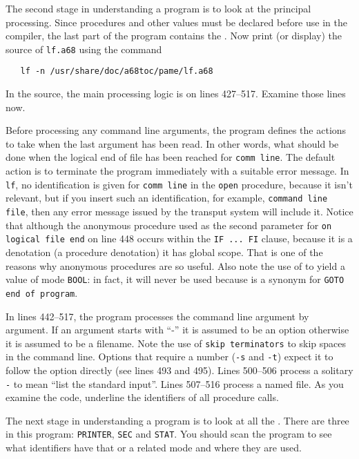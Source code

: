 The second stage in understanding a program is to look at the
principal processing. Since procedures and other values must be
declared before use in the  compiler,
the last part of the program contains the .
Now print (or display) the source of \verb|lf.a68| using the command
\begin{verbatim}
   lf -n /usr/share/doc/a68toc/pame/lf.a68
\end{verbatim}
\noindent
In the source, the main processing logic is on lines 427--517.
Examine those lines now.

Before processing any command line arguments, the program defines the
actions to take when the last argument has been read. In other words,
what should be done when the logical end of file has been reached for
\verb|comm line|. The default action is to terminate the program
immediately with a suitable error message. In \verb|lf|, no
identification is given for \verb|comm line| in the \verb|open|
procedure, because it isn't relevant, but if you insert such an
identification, for example, \verb|command line file|, then any error
message issued by the transput system will include it. Notice that
although the anonymous procedure used as the second parameter for
\verb|on logical file end| on line 448 occurs within the
\verb|IF ... FI| clause, because it is a denotation (a procedure
denotation) it has global scope. That is one of the reasons why
anonymous procedures are so useful. Also note the use of  to
yield a value of mode \verb|BOOL|: in fact, it will never be used
because  is a synonym for \verb|GOTO end of program|.

In lines 442--517, the program processes the command line argument by
argument. If an argument starts with ``-'' it is assumed to be an
option otherwise it is assumed to be a filename. Note the use of
\verb|skip terminators| to skip spaces in the command line.  Options
that require a number (\verb|-s| and \verb|-t|) expect it to follow
the option directly (see lines 493 and 495). Lines 500--506 process a
solitary \verb|-| to mean ``list the standard input''. Lines 507--516
process a named file. As you examine the code, underline the
identifiers of all procedure calls.

The next stage in understanding a program is to look at all the
.  There are three in this program:
\verb|PRINTER|, \verb|SEC| and \verb|STAT|.  You should scan the
program to see what identifiers have that or a related mode and where
they are used.

